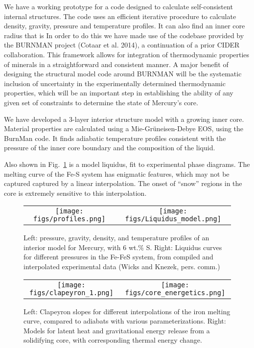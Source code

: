 We have a working prototype for a code designed to calculate self-consistent
internal structures. The code uses an efficient iterative procedure to
calculate density, gravity, pressure and temperature profiles. It can also find
an inner core radius that is In order to do this we have made use of the
codebase provided by the BURNMAN project (Cotaar et al. 2014), a continuation
of a prior CIDER collaboration. This framework allows for integration of
thermodynamic properties of minerals in a straightforward and consistent
manner. A major benefit of designing the structural model code around BURNMAN
will be the systematic inclusion of uncertainty in the experimentally
determined thermodynamic properties, which will be an important step in
establishing the ability of any given set of constraints to determine the state
of Mercury’s core. 

We have developed a 3-layer interior structure model with a growing inner core.
Material properties are calculated using a Mie-Gr\"{u}neisen-Debye EOS, using the BurnMan
code. It finds adiabatic temperature profiles consistent with the pressure of the 
inner core boundary and the composition of the liquid. 

Also shown in Fig.~\ref{fig:interior_model} is a model liquidus, fit to experimental
phase diagrams. The melting curve of the Fe-S system has enigmatic features, which
may not be captured captured by a  linear interpolation. The onset of ``snow''
regions in the core is extremely sensitive to this interpolation.

 \begin{figure}[H] %
   \centering
\begin{tabular}{cc}
 \texttt{[image: figs/profiles.png]} &
 \texttt{[image: figs/Liquidus\_model.png]} \\
\end{tabular}
   \caption{ Left: pressure, gravity, density, and temperature profiles of an
interior model for Mercury, with 6 wt.\% S.  Right: Liquidus curves for different pressures in the Fe-FeS system, from compiled and interpolated experimental data (Wicks and Knezek, pers. comm.) }
  \label{fig:interior_model}
\end{figure}


 \begin{figure}[H] %
   \centering
\begin{tabular}{cc}
 \texttt{[image: figs/clapeyron\_1.png]} &
 \texttt{[image: figs/core\_energetics.png]} \\
\end{tabular}
\caption{Left: Clapeyron slopes for different interpolations of the iron
melting curve, compared to adiabats with various parameterizations.  Right:  Models
for latent heat and gravitational energy release from a solidifying core, with
corresponding thermal energy change.}
\label{fig:core_energy}
\end{figure}


